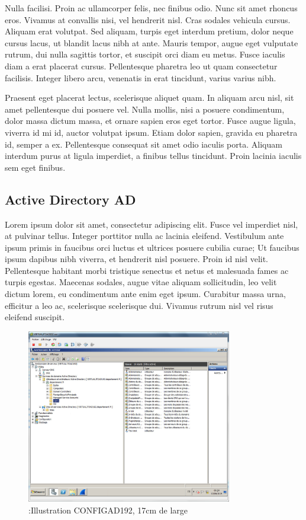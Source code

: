 \documentclass[a4paper,12pt]{report}
\begin{document}
Nulla facilisi. Proin ac ullamcorper felis, nec finibus odio. Nunc sit amet rhoncus eros. Vivamus at convallis nisi, vel hendrerit nisl. Cras sodales vehicula cursus. Aliquam erat volutpat. Sed aliquam, turpis eget interdum pretium, dolor neque cursus lacus, ut blandit lacus nibh at ante. Mauris tempor, augue eget vulputate rutrum, dui nulla sagittis tortor, et suscipit orci diam eu metus. Fusce iaculis diam a erat placerat cursus. Pellentesque pharetra leo ut quam consectetur facilisis. Integer libero arcu, venenatis in erat tincidunt, varius varius nibh.

Praesent eget placerat lectus, scelerisque aliquet quam. In aliquam arcu nisl, sit amet pellentesque dui posuere vel. Nulla mollis, nisi a posuere condimentum, dolor massa dictum massa, et ornare sapien eros eget tortor. Fusce augue ligula, viverra id mi id, auctor volutpat ipsum. Etiam dolor sapien, gravida eu pharetra id, semper a ex. Pellentesque consequat sit amet odio iaculis porta. Aliquam interdum purus at ligula imperdiet, a finibus tellus tincidunt. Proin lacinia iaculis sem eget finibus.

\subsection{Active Directory  \ac{AD}} %
Lorem ipsum dolor sit amet, consectetur adipiscing elit. Fusce vel imperdiet nisl, at pulvinar tellus. Integer porttitor nulla ac lacinia eleifend. Vestibulum ante ipsum primis in faucibus orci luctus et ultrices posuere cubilia curae; Ut faucibus ipsum dapibus nibh viverra, et hendrerit nisl posuere. Proin id nisl velit. Pellentesque habitant morbi tristique senectus et netus et malesuada fames ac turpis egestas. Maecenas sodales, augue vitae aliquam sollicitudin, leo velit dictum lorem, eu condimentum ante enim eget ipsum. Curabitur massa urna, efficitur a leo ac, scelerisque scelerisque dui. Vivamus rutrum nisl vel risus eleifend suscipit.


\begin{figure}[H]
  \centering
  \includegraphics[width=0.8\textwidth]{image/images/CONFIGAD192}
  \caption{:Illustration CONFIGAD192, 17cm de large}
\end{figure}
\end{document}

